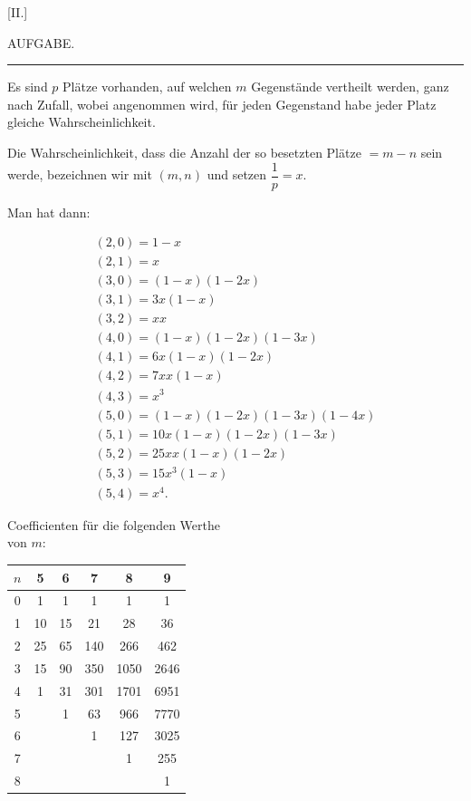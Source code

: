 \clearpage
{}
\begin{center}
[II.]
\end{center}

\begin{center}
AUFGABE.
\end{center}

\bigskip
\hrule
\bigskip

Es sind $p$ Plätze vorhanden, auf welchen $m$ Gegenstände vertheilt werden,
ganz nach Zufall, wobei angenommen wird, für jeden Gegenstand habe jeder
Platz gleiche Wahrscheinlichkeit.

Die Wahrscheinlichkeit, dass die Anzahl der so besetzten Plätze $= m-n$
sein werde, bezeichnen wir mit $(m,n)$ und setzen $\dfrac{1}{p}=x$.


Man hat dann:

\[
\begin{array}{l}
(2,0) = 1-x \\
(2,1) = x \\
(3,0) = (1-x)(1-2x) \\
(3,1) = 3x(1-x) \\
(3,2) = xx \\
(4,0) = (1-x)(1-2x)(1-3x) \\
(4,1) = 6x(1-x)(1-2x) \\
(4,2) = 7xx(1-x) \\
(4,3) = x^3 \\
(5,0) = (1-x)(1-2x)(1-3x)(1-4x) \\
(5,1) = 10x(1-x)(1-2x)(1-3x) \\
(5,2) = 25xx(1-x)(1-2x) \\
(5,3) = 15x^3(1-x) \\
(5,4) = x^4.
\end{array}
\]
\begin{center}
Coefficienten für die folgenden Werthe\\
von $m$:

\smallskip
\begin{tabular}{c||c|c|c|c|c}
$n$ & 5 & 6 & 7 & 8 & 9 \\ \hline\hline
0 & 1 & 1 & 1 & 1 & 1 \\ \hline
1 & 10 & 15 & 21 & 28 & 36 \\ \hline
2 & 25 & 65 & 140 & 266 & 462 \\ \hline
3 & 15 & 90 & 350 & 1050 & 2646 \\ \hline
4 & 1 & 31 & 301 & 1701 & 6951 \\ \hline
5 & & 1 & 63 & 966 & 7770 \\ \hline
6 & & & 1 & 127 & 3025 \\ \hline
7 & & & & 1 & 255 \\ \hline
8 & & & & & 1 \\
\end{tabular}

\end{center}
